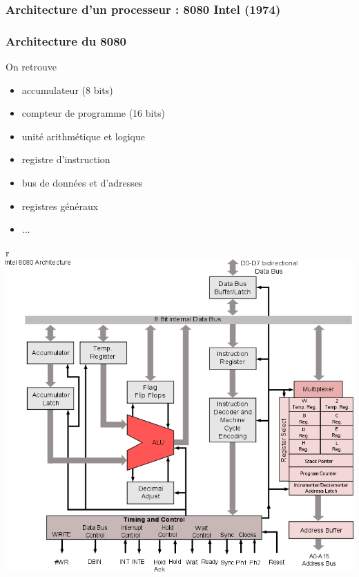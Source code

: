 \documentclass{beamer}
\begin{document}
\begin{frame}
\frametitle{Architecture d'un processeur : 8080 Intel (1974)}

\begin{multicols}{2}
\frametitle{Architecture du 8080}
On retrouve
\begin{itemize}
\item accumulateur (8 bits)
\item compteur de programme (16 bits)
\item unité arithmétique et logique
\item registre d'instruction
\item bus de données et d'adresses
\item registres généraux
\item ...
\end{itemize}
r\includegraphics[width=\linewidth]{Historique/8080.png}

\end{multicols}
\end{frame}
\end{document}
